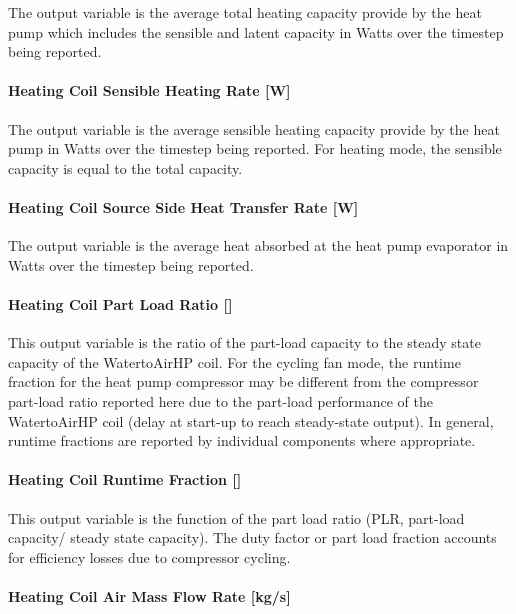 The output variable is the average total heating capacity provide by the heat pump which includes the sensible and latent capacity in Watts over the timestep being reported.

\paragraph{Heating Coil Sensible Heating Rate {[}W{]}}\label{heating-coil-sensible-heating-rate-w-1}

The output variable is the average sensible heating capacity provide by the heat pump in Watts over the timestep being reported. For heating mode, the sensible capacity is equal to the total capacity.

\paragraph{Heating Coil Source Side Heat Transfer Rate {[}W{]}}\label{heating-coil-source-side-heat-transfer-rate-w-1}

The output variable is the average heat absorbed at the heat pump evaporator in Watts over the timestep being reported.

\paragraph{Heating Coil Part Load Ratio {[]}}\label{heating-coil-part-load-ratio-1}

This output variable is the ratio of the part-load capacity to the steady state capacity of the WatertoAirHP coil. For the cycling fan mode, the runtime fraction for the heat pump compressor may be different from the compressor part-load ratio reported here due to the part-load performance of the WatertoAirHP coil (delay at start-up to reach steady-state output). In general, runtime fractions are reported by individual components where appropriate.

\paragraph{Heating Coil Runtime Fraction {[]}}\label{heating-coil-runtime-fraction-7}

This output variable is the function of the part load ratio (PLR, part-load capacity/ steady state capacity). The duty factor or part load fraction accounts for efficiency losses due to compressor cycling.

\paragraph{Heating Coil Air Mass Flow Rate {[}kg/s{]}}\label{heating-coil-air-mass-flow-rate-kgs-1}

